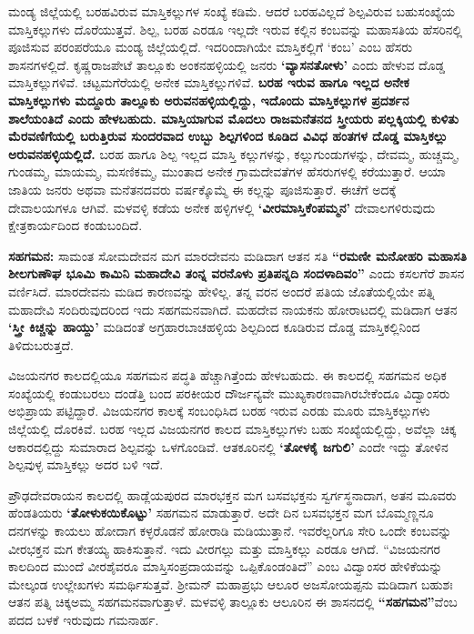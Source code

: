 ಮಂಡ್ಯ ಜಿಲ್ಲೆಯಲ್ಲಿ ಬರಹವಿರುವ ಮಾಸ್ತಿಕಲ್ಲುಗಳ ಸಂಖ್ಯೆ ಕಡಿಮೆ. ಆದರೆ ಬರಹವಿಲ್ಲದೆ ಶಿಲ್ಪವಿರುವ ಬಹುಸಂಖ್ಯೆಯ ಮಾಸ್ತಿಕಲ್ಲುಗಳು ದೊರೆಯುತ್ತವೆ. ಶಿಲ್ಪ, ಬರಹ ಎರಡೂ ಇಲ್ಲದೇ ಇರುವ ಕಲ್ಲಿನ ಕಂಬವನ್ನು ಮಹಾಸತಿಯ ಹೆಸರಿನಲ್ಲಿ ಪೂಜಿಸುವ ಪರಂಪರೆಯೂ ಮಂಡ್ಯ ಜಿಲ್ಲೆಯಲ್ಲಿದೆ. ಇದರಿಂದಾಗಿಯೇ ಮಾಸ್ತಿಕಲ್ಲಿಗೆ ‘ಕಂಬ’ ಎಂಬ ಹೆಸರು ಶಾಸನಗಳಲ್ಲಿದೆ. ಕೃಷ್ಣರಾಜಪೇಟೆ ತಾಲ್ಲೂಕು ಅಂಕನಹಳ್ಳಿಯಲ್ಲಿ ಜನರು \textbf{‘ವ್ಯಾಸನತೋಳು’} ಎಂದು ಹೇಳುವ ದೊಡ್ಡ ಮಾಸ್ತಿಕಲ್ಲುಗಳಿವೆ. ಚಟ್ಟಮಗೆರೆಯಲ್ಲಿ ಅನೇಕ ಮಾಸ್ತಿಕಲ್ಲುಗಳಿವೆ. \textbf{ಬರಹ ಇರುವ ಹಾಗೂ ಇಲ್ಲದ ಅನೇಕ ಮಾಸ್ತಿಕಲ್ಲುಗಳು ಮದ್ದೂರು ತಾಲ್ಲೂಕು ಅರುವನಹಳ್ಳಿಯಲ್ಲಿದ್ದು, ಇದೊಂದು ಮಾಸ್ತಿಕಲ್ಲುಗಳ ಪ್ರದರ್ಶನ ಶಾಲೆಯಂತಿದೆ ಎಂದು ಹೇಳಬಹುದು. ಮಾಸ್ತಿಯಾಗುವ ಮೊದಲು ರಾಜಮನೆತನದ ಸ್ತ್ರೀಯರು ಪಲ್ಲಕ್ಕಿಯಲ್ಲಿ ಕುಳಿತು ಮೆರವಣಿಗೆಯಲ್ಲಿ ಬರುತ್ತಿರುವ ಸುಂದರವಾದ ಉಬ್ಬು ಶಿಲ್ಪಗಳಿಂದ ಕೂಡಿದ ವಿವಿಧ ಹಂತಗಳ ದೊಡ್ಡ ಮಾಸ್ತಿಕಲ್ಲು ಅರುವನಹಳ್ಳಿಯಲ್ಲಿದೆ.} ಬರಹ ಹಾಗೂ ಶಿಲ್ಪ ಇಲ್ಲದ ಮಾಸ್ತಿ ಕಲ್ಲುಗಳನ್ನು, ಕಲ್ಲುಗುಂಡುಗಳನ್ನು, ದೇವಮ್ಮ, ಹುಚ್ಚಮ್ಮ, ಗುಂಡಮ್ಮ, ಮಾಯಮ್ಮ, ಮಸಣಿಕಮ್ಮ, ಮುಂತಾದ ಅನೇಕ ಗ್ರಾಮದೇವತೆಗಳ ಹೆಸರುಗಳಲ್ಲಿ ಕರೆಯುತ್ತಾರೆ. ಆಯಾ ಜಾತಿಯ ಜನರು ಅಥವಾ ಮನೆತನದವರು ವರ್ಷಕ್ಕೊಮ್ಮೆ ಈ ಕಲ್ಲನ್ನು ಪೂಜಿಸುತ್ತಾರೆ. ಈಚೆಗೆ ಅದಕ್ಕೆ ದೇವಾಲಯಗಳೂ ಆಗಿವೆ. ಮಳವಳ್ಳಿ ಕಡೆಯ ಅನೇಕ ಹಳ್ಳಿಗಳಲ್ಲಿ \textbf{‘ವೀರಮಾಸ್ತಿಕೆಂಪಮ್ಮನ’} ದೇವಾಲಗಳಿರುವುದು ಕ್ಷೇತ್ರಕಾರ್ಯದಿಂದ ಕಂಡುಬಂದಿದೆ.

\textbf{ಸಹಗಮನ:} ಸಾಮಂತ ಸೋಮದೇವನ ಮಗ ಮಾರದೇವನು ಮಡಿದಾಗ ಆತನ ಸತಿ \textbf{“ರಮಣೀ ಮನೋಹರಿ ಮಹಾಸತಿ ಶೀಲಗುಣೌಘ ಭೂಮಿ ಕಾಮಿನಿ ಮಹಾದೇವಿ ತಂನ್ನ ವರನೊಳು ಪ್ರತಿಪನ್ನದಿ ಸಂದಳಾದಿವಂ”} ಎಂದು ಕಸಲಗೆರೆ ಶಾಸನ ವರ್ಣಿಸಿದೆ. ಮಾರದೇವನು ಮಡಿದ ಕಾರಣವನ್ನು ಹೇಳಿಲ್ಲ. ತನ್ನ ವರನ ಅಂದರೆ ಪತಿಯ ಜೊತೆಯಲ್ಲಿಯೇ ಪತ್ನಿ ಮಹಾದೇವಿ ಸಂದಿರುವುದರಿಂದ ಇದು ಸಹಗಮನವಾಗಿದೆ. ಮಹದೇವ ನಾಯಕನು ಹೋರಾಟದಲ್ಲಿ ಮಡಿದಾಗ ಆತನ \textbf{‘ಸ್ತ್ರೀ ಕಿಚ್ಚನ್ನು ಹಾಯ್ದು’} ಮಡಿದಂತೆ ಅಗ್ರಹಾರಬಾಚಹಳ್ಳಿಯ ಶಿಲ್ಪದಿಂದ ಕೂಡಿರುವ ದೊಡ್ಡ ಮಾಸ್ತಿಕಲ್ಲಿನಿಂದ ತಿಳಿದುಬರುತ್ತದೆ.

ವಿಜಯನಗರ ಕಾಲದಲ್ಲಿಯೂ ಸಹಗಮನ ಪದ್ಧತಿ ಹೆಚ್ಚಾಗಿತ್ತೆಂದು ಹೇಳಬಹುದು. ಈ ಕಾಲದಲ್ಲಿ ಸಹಗಮನ ಅಧಿಕ ಸಂಖ್ಯೆಯಲ್ಲಿ ಕಂಡುಬರಲು ದಂಡೆತ್ತಿ ಬಂದ ಪರಕೀಯರ ದೌರ್ಜನ್ಯವೇ ಮುಖ್ಯಕಾರಣವಾಗಿರಬೇಕೆಂದೂ ವಿದ್ವಾಂಸರು ಅಭಿಪ್ರಾಯ ಪಟ್ಟಿದ್ದಾರೆ. ವಿಜಯನಗರ ಕಾಲಕ್ಕೆ ಸಂಬಂಧಿಸಿದ ಬರಹ ಇರುವ ಎರಡು ಮೂರು ಮಾಸ್ತಿಕಲ್ಲುಗಳು ಜಿಲ್ಲೆಯಲ್ಲಿ ದೊರಕಿವೆ. ಬರಹ ಇಲ್ಲದ ವಿಜಯನಗರ ಕಾಲದ ಮಾಸ್ತಿಕಲ್ಲುಗಳು ಬಹು ಸಂಖ್ಯೆಯಲ್ಲಿದ್ದು, ಅವೆಲ್ಲಾ ಚಿಕ್ಕ ಆಕಾರದಲ್ಲಿದ್ದು ಸುಮಾರಾದ ಶಿಲ್ಪವನ್ನು ಒಳಗೊಂಡಿವೆ. ಆತಕೂರಿನಲ್ಲಿ \textbf{‘ತೋಳಕೈ ಜಗುಲಿ’} ಎಂದೇ ಇದ್ದು ತೋಳಿನ ಶಿಲ್ಪವುಳ್ಳ ಮಾಸ್ತಿಕಲ್ಲು ಅದರ ಬಳಿ ಇದೆ.

ಪ್ರೌಢದೇವರಾಯನ ಕಾಲದಲ್ಲಿ ಹಾಡ್ಲೆಯಪುರದ ಮಾರಭಕ್ತನ ಮಗ ಬಸವಭಕ್ತನು ಸ್ವರ್ಗಸ್ಥನಾದಾಗ, ಅತನ ಮೂವರು ಹೆಂಡತಿಯರು \textbf{‘ತೋಳುಕಯಿಕೊಟ್ಟು’} ಸಹಗಮನ ಮಾಡುತ್ತಾರೆ. ಅದೇ ದಿನ ಬಸವಭಕ್ತನ ಮಗ ಬೊಮ್ಮಣ್ಣನೂ ದನಗಳನ್ನು ಕಾಯಲು ಹೋದಾಗ ಕಳ್ಳರೊಡನೆ ಹೋರಾಡಿ ಮಡಿಯುತ್ತಾನೆ. ಇವರೆಲ್ಲರಿಗೂ ಸೇರಿ ಒಂದೇ ಕಂಬವನ್ನು ವೀರಭಕ್ತನ ಮಗ ಕೇತಯ್ಯ ಹಾಕಿಸುತ್ತಾನೆ. ಇದು ವೀರಗಲ್ಲು ಮತ್ತು ಮಾಸ್ತಿಕಲ್ಲು ಎರಡೂ ಆಗಿದೆ. “ವಿಜಯನಗರ ಕಾಲದಿಂದ ಮುಂದೆ ವೀರಶೈವರೂ ಮಾಸ್ತಿಸಂಪ್ರದಾಯವನ್ನು ಒಪ್ಪಿಕೊಂಡಂತಿದೆ” ಎಂಬ ವಿದ್ವಾಂಸರ ಹೇಳಿಕೆಯನ್ನು ಮೇಲ್ಕಂಡ ಉಲ್ಲೇಖಗಳು ಸಮರ್ಥಿಸುತ್ತವೆ. ಶ‍್ರೀಮನ್​ ಮಹಾಪ್ರಭು ಆಲೂರ ಅಜಸೋಯಪ್ಪನು ಮಡಿದಾಗ ಬಹುಶಃ ಆತನ ಪತ್ನಿ ಚಿಕ್ಕಅಮ್ಮ ಸಹಗಮನವಾಗುತ್ತಾಳೆ. ಮಳವಳ್ಳಿ ತಾಲ್ಲೂಕು ಆಲೂರಿನ ಈ ಶಾಸನದಲ್ಲಿ \textbf{“ಸಹಗಮನ”}ವೆಂಬ ಪದದ ಬಳಕೆ ಇರುವುದು ಗಮನಾರ್ಹ.

